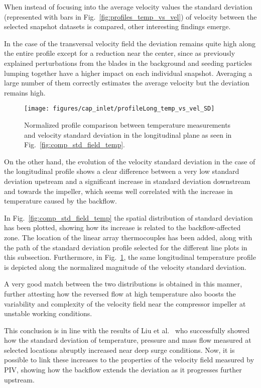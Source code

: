 When instead of focusing into the average velocity values the standard deviation (represented with bars in Fig.~\ref{fig:profiles_temp_vs_vel}) of velocity between the selected snapshot datasets is compared, other interesting findings emerge.

In the case of the transversal velocity field the deviation remains quite high along the entire profile except for a reduction near the center, since as previously explained perturbations from the blades in the background and seeding particles lumping together have a higher impact on each individual snapshot. Averaging a large number of them correctly estimates the average velocity but the deviation remains high.

\begin{figure}[thb!]
\centering
\texttt{[image: figures/cap\_inlet/profileLong\_temp\_vs\_vel\_SD]}
\caption[Normalized profile comparison of vel. $\sigma$ vs. temp.]{Normalized profile comparison between temperature measurements and velocity standard deviation in the longitudinal plane as seen in Fig.~\ref{fig:comp_std_field_temp}.}
\label{fig:profiles_temp_vs_vel_long_SD}
\end{figure}

On the other hand, the evolution of the velocity standard deviation in the case of the longitudinal profile shows a clear difference between a very low standard deviation upstream and a significant increase in standard deviation downstream and towards the impeller, which seems well correlated with the increase in temperature caused by the backflow.

In Fig.~\ref{fig:comp_std_field_temp} the spatial distribution of standard deviation has been plotted, showing how its increase is related to the backflow-affected zone. The location of the linear array thermocouples has been added, along with the path of the standard deviation profile selected for the different line plots in this subsection. Furthermore, in Fig.~\ref{fig:profiles_temp_vs_vel_long_SD}, the same longitudinal temperature profile is depicted along the normalized magnitude of the velocity standard deviation. 

A very good match between the two distributions is obtained in this manner, further attesting how the reversed flow at high temperature also boosts the variability and complexity of the velocity field near the compressor impeller at unstable working conditions.

This conclusion is in line with the results of Liu et al.~\cite{liu2013methods} who successfully showed how the standard deviation of temperature, pressure and mass flow measured at selected locations abruptly increased near deep surge conditions. Now, it is possible to link these increases to the properties of the velocity field measured by PIV, showing how the backflow extends the deviation as it progresses further upstream.

